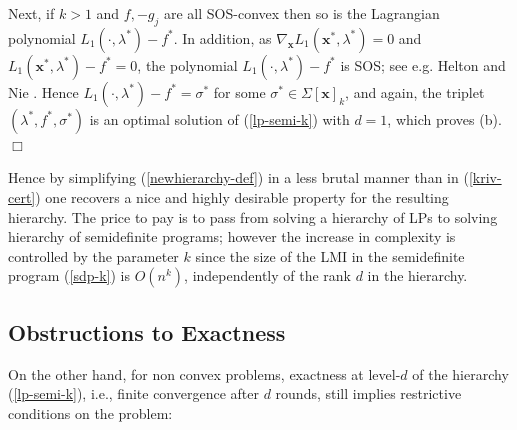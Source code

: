 \documentclass[11pt]{article}
\numberwithin{equation}{section}
\def\x{\mathbf{x}}
\begin{document}
 Next, if $k>1$ and $f,-g_j$ are all SOS-convex then so is the Lagrangian polynomial
 $L_1(\cdot,\lambda^*)-f^*$. In addition, as 
 $\nabla_\x L_1(\x^*,\lambda^*)=0$ and $L_1(\x^*,\lambda^*)-f^*=0$,
 the polynomial $L_1(\cdot,\lambda^*)-f^*$ is SOS; see e.g. Helton and Nie \cite[Lemma 4.2]{nie-helton-survey}. Hence 
 $L_1(\cdot,\lambda^*)-f^*=\sigma^*$ for some $\sigma^*\in\Sigma[\x]_k$, and again,
 the triplet $(\lambda^*,f^*,\sigma^*)$ is an optimal solution of (\ref{lp-semi-k}) with $d=1$, which proves (b).
 $\Box$
 \vspace{0.2cm}
 
 Hence  by simplifying (\ref{newhierarchy-def}) in a less brutal manner than in (\ref{kriv-cert})
 one recovers a nice and highly desirable property for the resulting hierarchy. The price to pay is to pass from solving a hierarchy of LPs to solving  hierarchy of semidefinite programs; however the increase in complexity is controlled
 by the parameter $k$ since the size of the LMI in the semidefinite program (\ref{sdp-k}) is $O(n^k)$, independently of the rank $d$ in the hierarchy.
 
\subsection{Obstructions to Exactness}
On the other hand, for non convex problems, exactness at level-$d$ of the hierarchy (\ref{lp-semi-k}), i.e., finite convergence
after $d$ rounds, still implies restrictive conditions on the problem:
\end{document}
